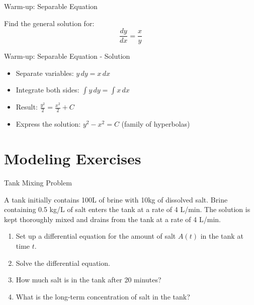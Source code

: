 \documentclass[10pt,aspectratio=169]{beamer}
\newcommand{\formula}[1]{\textit{#1}}
\begin{document}
\begin{frame}{Warm-up: Separable Equation}
    \begin{problembox}
        Find the general solution for:
        \formula{\[ \frac{dy}{dx} = \frac{x}{y} \]}
    \end{problembox}
\end{frame}

\begin{frame}{Warm-up: Separable Equation - Solution}
    \begin{solutionbox}
        \begin{itemize}
            \item Separate variables: $y \, dy = x \, dx$
            \item Integrate both sides: $\int y \, dy = \int x \, dx$
            \item Result: $\frac{y^2}{2} = \frac{x^2}{2} + C$
            \item Express the solution: $y^2 - x^2 = C$ (family of hyperbolas)
        \end{itemize}
    \end{solutionbox}
\end{frame}

\section{Modeling Exercises}
\begin{frame}{Tank Mixing Problem}
    \begin{problembox}
        A tank initially contains 100L of brine with 10kg of dissolved salt. Brine containing 0.5 kg/L of salt enters the tank at a rate of 4 L/min. The solution is kept thoroughly mixed and drains from the tank at a rate of 4 L/min.
        \begin{enumerate}
            \item Set up a differential equation for the amount of salt $A(t)$ in the tank at time $t$.
            \item Solve the differential equation.
            \item How much salt is in the tank after 20 minutes?
            \item What is the long-term concentration of salt in the tank?
        \end{enumerate}
    \end{problembox}
\end{frame}
\end{document}
